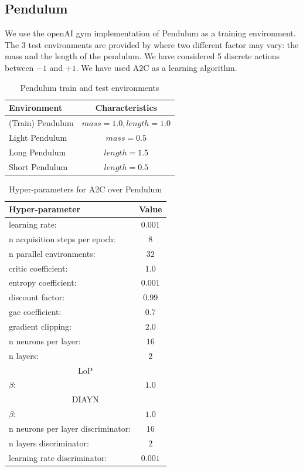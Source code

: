 \subsection{Pendulum}
\label{subsec:pendulum}

We use the openAI gym implementation of Pendulum as a training environment. The 3 test environments are provided by \cite{PackerGao:1810.12282} where two different factor may vary: the mass and the length of the pendulum. We have considered 5 discrete actions between $-1$ and $+1$. We have used A2C as a learning algorithm.



\begin{table}[h!]
\begin{center}
\begin{tabular}{l|c} \toprule
\textbf{Environment} & \textbf{Characteristics} \\ \hline
(Train) Pendulum & $mass=1.0, length=1.0$ \\ \hline
Light Pendulum  & $mass=0.5$ \\
Long Pendulum &  $length=1.5$ \\
Short Pendulum  & $length=0.5$ \\
\hline
\end{tabular}
\end{center}
\caption{Pendulum train and test environments}
\end{table}


\begin{table}[h!]
\begin{center}
\begin{tabular}{l|c} \toprule
   \textbf{Hyper-parameter} & \textbf{Value} \\ \hline
    learning rate: &  $0.001$\\
    n acquisition steps per epoch: & $8$ \\
    n parallel environments: &  $32$\\
    critic coefficient: &  $1.0$\\
    entropy coefficient: &  $0.001$\\
    discount factor: &  $0.99$\\
    gae coefficient: &  $0.7$\\
    gradient clipping: & $2.0$ \\ 
    n neurons per layer: & $16$ \\
    n layers: & $2$ \\ \toprule
    \multicolumn{2}{c}{LoP} \\  \hline
    $\beta$: & $1.0$ \\
    \toprule
    \multicolumn{2}{c}{DIAYN} \\ \hline
    $\beta$: & $1.0$ \\
    n neurons per layer discriminator: & $16$ \\
    n layers discriminator: & $2$ \\
    learning rate discriminator: & $0.001$ \\ \hline
\end{tabular}
\end{center}
\caption{Hyper-parameters for A2C over Pendulum}
\label{table:hp_pendulum}
\end{table}


